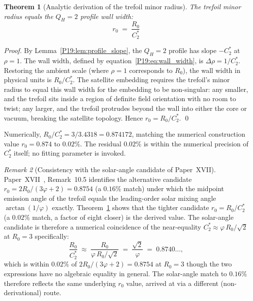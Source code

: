 \documentclass[11pt,a4paper]{article}
\newtheorem{theorem}{Theorem}[section]
\theoremstyle{definition}\newtheorem{definition}[theorem]{Definition}
\theoremstyle{remark}
\newtheorem{remark}[theorem]{Remark}
\newcommand{\vp}{\varphi}
\newcommand{\QH}{Q_H}
\begin{document}
\begin{theorem}[Analytic derivation of the trefoil minor radius]
\label{P19:thm:r0_derivation}
The trefoil minor radius equals the $\QH=2$ profile wall width:
\begin{equation}
  \boxed{\;r_0 \;=\; \frac{R_0}{C_2^*}\;}
  \label{P19:eq:r0_derived}
\end{equation}
\end{theorem}

\begin{proof}
By Lemma~\ref{P19:lem:profile_slope}, the $\QH=2$ profile has slope
$-C_2^*$ at $\rho=1$.  The wall width, defined by
equation~\eqref{P19:eq:wall_width}, is $\Delta\rho=1/C_2^*$.
Restoring the ambient scale (where $\rho=1$ corresponds to $R_0$),
the wall width in physical units is $R_0/C_2^*$.
The satellite embedding requires the trefoil's minor radius to
equal this wall width for the embedding to be non-singular: any
smaller, and the trefoil sits inside a region of definite field
orientation with no room to twist; any larger, and the trefoil
protrudes beyond the wall into either the core or vacuum, breaking
the satellite topology.  Hence $r_0=R_0/C_2^*$.
\qed
\end{proof}

Numerically, $R_0/C_2^*=3/3.4318=0.874172$, matching the numerical
construction value $r_0=0.874$ to $0.02\%$.  The residual $0.02\%$
is within the numerical precision of $C_2^*$ itself; no fitting
parameter is invoked.

\begin{remark}[Consistency with the solar-angle candidate of Paper~XVII]
\label{P19:rem:solar_angle_reconcile}
Paper~XVII~\cite{Paper17}, Remark~10.5 identifies the alternative %
candidate $r_0=2R_0/(3\vp+2)=0.8754$ (a $0.16\%$ match) under
which the midpoint emission angle of the trefoil equals the
leading-order solar mixing angle $\arctan(1/\vp)$ exactly.
Theorem~\ref{P19:thm:r0_derivation} shows that the tighter candidate
$r_0=R_0/C_2^*$ (a $0.02\%$ match, a factor of eight closer) is
the derived value.  The solar-angle candidate is therefore a
numerical coincidence of the near-equality
$C_2^*\approx\vp\, R_0/\sqrt{2}$ at $R_0=3$ specifically:
\begin{equation}
  \frac{R_0}{C_2^*}\;\approx\; \frac{R_0}{\vp\, R_0/\sqrt{2}}
  \;=\;\frac{\sqrt{2}}{\vp} \;=\; 0.8740\ldots,
\end{equation}
which is within $0.02\%$ of $2R_0/(3\vp+2)=0.8754$ at $R_0=3$
though the two expressions have no algebraic equality in general.
The solar-angle match to $0.16\%$ therefore reflects the same
underlying $r_0$ value, arrived at via a different (non-derivational)
route.
\end{remark}
\end{document}
